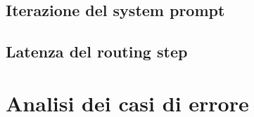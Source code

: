 \subsection{Iterazione del system prompt}
\label{subsec:eval-iterazione}

%

\subsection{Latenza del routing step}
\label{subsec:eval-latenza}

%

\section{Analisi dei casi di errore}
\label{sec:eval-errori}

